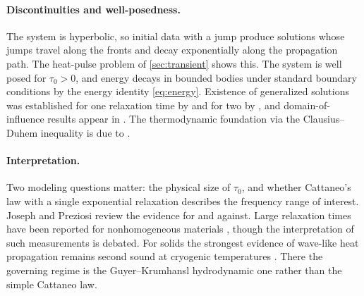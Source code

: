 \paragraph{Discontinuities and well-posedness.} The system is hyperbolic, so initial data with a jump produce solutions whose jumps travel along the fronts and decay exponentially along the propagation path. The heat-pulse problem of \cref{sec:transient} shows this. The system is well posed for $\tau_0>0$, and energy decays in bounded bodies under standard boundary conditions by the energy identity \eqref{eq:energy}. Existence of generalized solutions was established for one relaxation time by \citep{Bem1982} and for two by \citep{Bem1983}, and domain-of-influence results appear in \citep{Ignaczak1980}. The thermodynamic foundation via the Clausius--Duhem inequality is due to \citep{GurtinWilliams1966}.

\paragraph{Interpretation.} Two modeling questions matter: the physical size of $\tau_0$, and whether Cattaneo's law with a single exponential relaxation describes the frequency range of interest. Joseph and Preziosi \citep{Joseph1989,Joseph1990} review the evidence for and against. Large relaxation times have been reported for nonhomogeneous materials \citep{Kaminski1990,Mitra1995}, though the interpretation of such measurements is debated. For solids the strongest evidence of wave-like heat propagation remains second sound at cryogenic temperatures \citep{Ackerman1966,Jackson1970}. There the governing regime is the Guyer--Krumhansl hydrodynamic one \citep{GuyerKrumhansl1966II} rather than the simple Cattaneo law.

